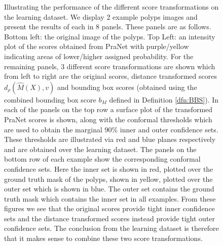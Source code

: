 \begin{figure}[h!]
	\caption{Illustrating the performance of the different score transformations on the learning dataset. We display 2 example polyps images and present the results of each in 8 panels. These panels are as follows. Bottom left: the original image of the polyps. Top Left: an intensity plot of the scores obtained from PraNet with purple/yellow indicating areas of lower/higher assigned probability. For the remaining panels, 3 different score transformations are shown which from left to right are the original scores, distance transformed scores $d_\rho(\hat{M}(X), v)$ and bounding box scores (obtained using the combined bounding box score $b_M$ defined in Definition \ref{dfn:BBS}). In each of the panels on the top row a surface plot of the transformed PraNet scores is shown, along with the conformal thresholds which are used to obtain the marginal 90\% inner and outer confidence sets.  These thresholds are illustrated via red and blue planes respectively and are obtained over the learning dataset. The panels on the bottom row of each example show the corresponding conformal confidence sets. Here the inner set is shown in red, plotted over the ground truth mask of the polyps, shown in yellow, plotted over the outer set which is shown in blue. The outer set contains the ground truth mask which contains the inner set in all examples. From these figures we see that the original scores provide tight inner confidence sets and the distance transformed scores instead provide tight outer confidence sets.
The conclusion from the learning dataset is therefore that it makes sense to combine these two score transformations.}
	\label{fig:learning}
	\vspace{-1cm}
\end{figure}
